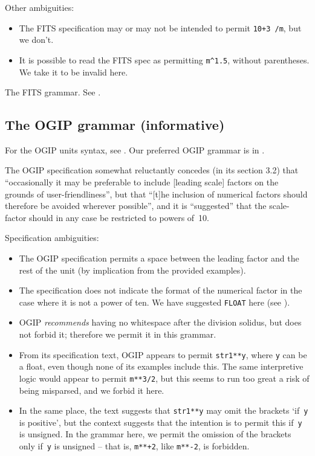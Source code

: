 \documentclass[11pt,a4paper]{ivoa}
\begin{document}
Other ambiguities:
\begin{itemize}
\item The FITS specification may or may not be intended to permit
  \texttt{10+3 /m}, but we don't.
\item It is possible to read the FITS spec as permitting
  \texttt{m\^{}1.5}, without parentheses.  We take it to be
  invalid here.
\end{itemize}

\clearpage
\begin{table}[t]

\caption[The FITS grammar]{\label{tabx:fitsgrammar}The FITS grammar.
See .}
\end{table}
\clearpage

\subsection{The OGIP grammar (informative)}
\label{appx:ogipgrammar}

For the OGIP units syntax, see \cite{george95}.  Our preferred OGIP
grammar is in .

The OGIP specification somewhat reluctantly concedes (in its section
3.2) that ``occasionally it may be preferable to include [leading
scale] factors on the grounds of user-friendliness'', but that ``[t]he
inclusion of numerical factors should therefore be avoided wherever
possible'', and it is ``suggested'' that the scale-factor should in any case
be restricted to powers of~10.

Specification ambiguities:
\begin{itemize}
\item The OGIP specification permits a space between the leading
  factor and the rest of the unit (by implication from the provided
  examples).
\item The specification does not indicate the format of the numerical
  factor in the case where it is not a power of ten.  We have
  suggested \texttt{FLOAT} here (see ).
\item OGIP \emph{recommends} having no whitespace after the division
  solidus, but does not forbid it; therefore we permit it in this
  grammar.
\item From its specification text, OGIP appears to permit
  \texttt{str1**y}, where \texttt{y} can be a float, even though none
  of its examples include this.  The same interpretive logic would
  appear to permit \texttt{m**3/2}, but this seems to run too great a
  risk of being misparsed, and we forbid it here.
\item In the same place, the text suggests that \texttt{str1**y} may
  omit the brackets `if~\texttt y is positive', but the context
  suggests that the intention is to permit this if~\texttt y is
  unsigned.  In the grammar here, we permit the omission of the
  brackets only if~\texttt y is unsigned -- that is, \texttt{m**+2},
  like \texttt{m**-2}, is forbidden.
\end{itemize}
\end{document}
